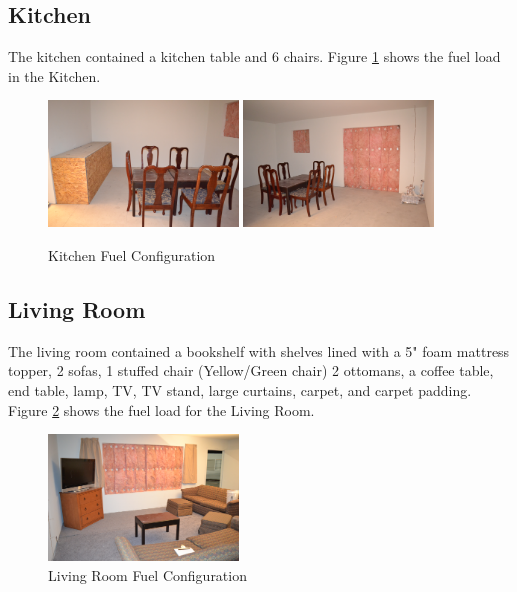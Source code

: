 \documentclass[12pt,oneside]{book}
\begin{document}
\clearpage

\subsection*{Kitchen}
The kitchen contained a kitchen table and 6 chairs. Figure \ref{figure:Kitchen_fuel} shows the fuel load in the Kitchen. 

\begin{figure}[H]
\centering
\includegraphics[width=0.45\textwidth]{../0_Images/Fuel/Kitchen.jpg}
\includegraphics[width=0.45\textwidth]{../0_Images/Fuel/Dining_Room.jpg}
\caption{Kitchen Fuel Configuration}
\label{figure:Kitchen_fuel}
\end{figure}


\subsection*{Living Room}
The living room contained a bookshelf with shelves lined with a 5" foam mattress topper, 2 sofas, 1 stuffed chair (Yellow/Green chair) 2 ottomans, a coffee table, end table, lamp, TV, TV stand, large curtains, carpet, and carpet padding. Figure \ref{figure:Living_Room_fuel} shows the fuel load for the Living Room. 

\begin{figure}[H]
\centering
\includegraphics[width=0.45\textwidth]{../0_Images/Fuel/Living_Room.jpg}
\caption{Living Room Fuel Configuration}
\label{figure:Living_Room_fuel}
\end{figure}
\end{document}
